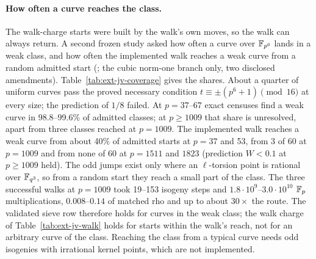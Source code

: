 \paragraph{How often a curve reaches the class.} The walk-charge starts were
built by the walk's own moves, so the walk can always return. A second
frozen study asked how often a curve over $\mathbb{F}_{p^6}$ lands in a weak class,
and how often the implemented walk reaches a weak curve from a random
admitted start (; the
cubic norm-one branch only, two disclosed amendments).
Table~\ref{tab:ext-jv-coverage} gives the shares. About a quarter of
uniform curves pass the proved necessary condition
$t\equiv\pm(p^6+1)\pmod{16}$ at every size; the prediction of $1/8$
failed. At $p=37$--$67$ exact censuses find a weak curve in 98.8--99.6\%
of admitted classes; at $p\ge1009$ that share is unresolved, apart from
three classes reached at $p=1009$. The implemented walk reaches a weak curve
from about 40\% of admitted starts at $p=37$ and 53, from 3 of 60 at
$p=1009$ and from none of 60 at $p=1511$ and $1823$ (prediction $W<0.1$ at
$p\ge1009$ held). The odd jumps exist only where an $\ell$-torsion point is
rational over $\mathbb{F}_{q^3}$, so from a random start they reach a small part
of the class. The three successful walks at $p=1009$ took 19--153 isogeny
steps and $1.8\cdot10^9$--$3.0\cdot10^{10}$ $\mathbb{F}_p$ multiplications,
$0.008$--$0.14$ of matched rho and up to about $30\times$ the route. The
validated sieve row therefore holds for curves in the weak class; the
walk charge of Table~\ref{tab:ext-jv-walk} holds for starts within the
walk's reach, not for an arbitrary curve of the class. Reaching the class
from a typical curve needs odd isogenies with irrational kernel points,
which are not implemented.

